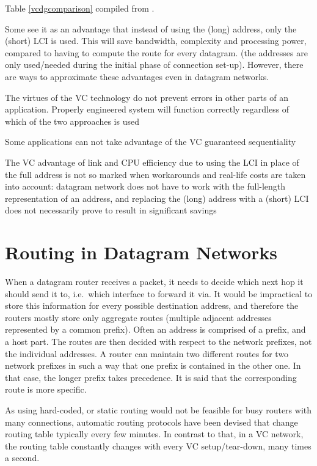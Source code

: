 \documentclass[10pt]{report}
\begin{document}
Table \ref{vcdgcomparison} compiled from \cite{kurose} \cite[p298--299]{stallings} \cite{russell}.


Some see it as an advantage that instead of using the (long) address,
only the (short) LCI is used.  This will save bandwidth, complexity and
processing power, compared to having to compute the route for every
datagram. \cite[p158]{russell} (the addresses are only used/needed
during the initial phase of connection set-up).  However, there are ways
to approximate these advantages even in datagram networks.

The virtues of the VC technology do not prevent errors in other parts of
an application.  Properly engineered system will function correctly
regardless of which of the two approaches is used \cite[p161]{russell}

Some applications can not take advantage of the VC guaranteed
sequentiality \cite[p161]{russell}

The VC advantage of link and CPU efficiency due to using the LCI in
place of the full address is not so marked when workarounds and
real-life costs are taken into account: datagram network does not have
to work with the full-length representation of an address, and replacing
the (long) address with a (short) LCI does not necessarily prove to
result in significant savings \cite[p161]{russell}

\section{Routing in Datagram Networks}

When a datagram router receives a packet, it needs to decide which next
hop it should send it to, i.e.\ which interface to forward it via.  It
would be impractical to store this information for every possible
destination address, and therefore the routers mostly store only
aggregate routes (multiple adjacent addresses represented by a common
prefix).  Often an address is
comprised of a prefix, and a host part.  The routes are then
decided with respect to the network prefixes, not the individual
addresses.  A router can maintain two different routes for two network
prefixes in such a way that one prefix is contained in the other one.
In that case, the longer prefix takes precedence.  It is said that the
corresponding route is more specific.

As using hard-coded, or static routing would not be feasible for busy
routers with many connections, automatic routing protocols have been
devised that change routing table typically every few minutes.  In
contrast to that, in a VC network, the routing table constantly changes
with every VC setup/tear-down, many times a second.
\end{document}
